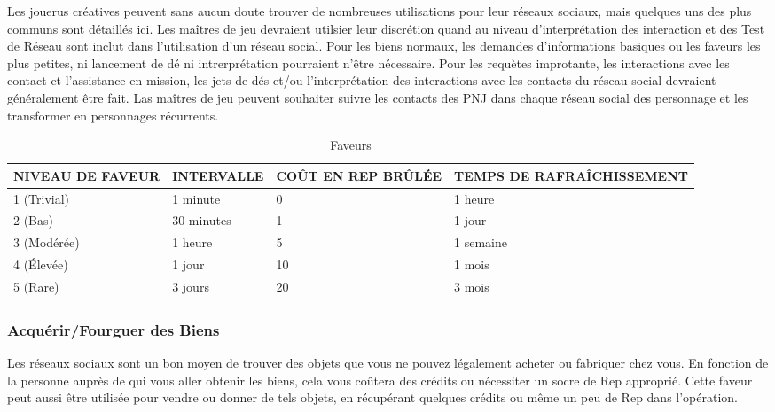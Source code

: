 Les jouerus créatives peuvent sans aucun doute trouver de nombreuses utilisations pour leur réseaux sociaux, mais quelques uns des plus communs sont détaillés ici. Les maîtres de jeu devraient utilsier leur discrétion quand au niveau d'interprétation des interaction et des Test de Réseau sont inclut dans l'utilisation d'un réseau social. Pour les biens normaux, les demandes d'informations basiques ou les faveurs les plus petites, ni lancement de dé ni intrerprétation pourraient n'être nécessaire. Pour les requètes improtante, les interactions avec les contact et l'assistance en mission, les jets de dés et/ou l'interprétation des interactions avec les contacts du réseau social devraient généralement être fait. Las maîtres de jeu peuvent souhaiter suivre les contacts des PNJ dans chaque réseau social des personnage et les transformer en personnages récurrents. 

\begin{table} \caption{Faveurs} \begin{tabular}{|l|l|l|l|} \hline

NIVEAU DE FAVEUR &INTERVALLE &COÛT EN REP BRÛLÉE &TEMPS DE RAFRAÎCHISSEMENT\\ \hline

1 (Trivial) &1 minute &0 &1 heure \\ \hline

2 (Bas) &30 minutes &1 &1 jour \\ \hline

3 (Modérée) &1 heure &5 &1 semaine\\ \hline

4 (Élevée) &1 jour &10 &1 mois \\ \hline

5 (Rare) &3 jours &20 &3 mois \\ \hline

\end{tabular} \end{table} 

\subsubsection{Acquérir/Fourguer des Biens} 

Les réseaux sociaux sont un bon moyen de trouver des objets que vous ne pouvez légalement acheter ou fabriquer chez vous. En fonction de la personne auprès de qui vous aller obtenir les biens, cela vous coûtera des crédits ou nécessiter un socre de Rep approprié. Cette faveur peut aussi être utilisée pour vendre ou donner de tels objets, en récupérant quelques crédits ou même un peu de Rep dans l'opération. 

